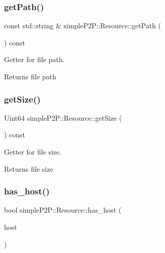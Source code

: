 \subsubsection{\texorpdfstring{get\+Path()}{getPath()}}
{\footnotesize\ttfamily const std\+::string \& simple\+P2\+P\+::\+Resource\+::get\+Path (\begin{DoxyParamCaption}{ }\end{DoxyParamCaption}) const}



Getter for file path. 

\begin{DoxyReturn}{Returns}
file path 
\end{DoxyReturn}
\mbox{\label{classsimpleP2P_1_1Resource_adadeb491cccabbce2e1d883f9e8519f7}} 
\subsubsection{\texorpdfstring{get\+Size()}{getSize()}}
{\footnotesize\ttfamily Uint64 simple\+P2\+P\+::\+Resource\+::get\+Size (\begin{DoxyParamCaption}{ }\end{DoxyParamCaption}) const}



Getter for file size. 

\begin{DoxyReturn}{Returns}
file size 
\end{DoxyReturn}
\mbox{\label{classsimpleP2P_1_1Resource_ac3c067c66ef0db0a25a7904a83f50e3d}} 
\subsubsection{\texorpdfstring{has\+\_\+host()}{has\_host()}}
{\footnotesize\ttfamily bool simple\+P2\+P\+::\+Resource\+::has\+\_\+host (\begin{DoxyParamCaption}\item[{\hyperlink{classsimpleP2P_1_1Host}{simple\+P2\+P\+::\+Host}}]{host }\end{DoxyParamCaption})}



